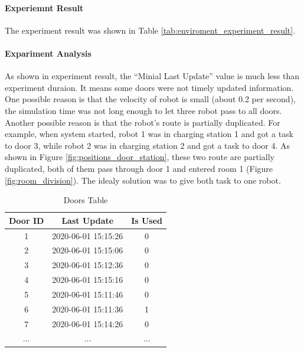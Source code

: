 \paragraph{Experiemnt Result} The experiment result was shown in Table \ref{tab:enviroment_experiment_result}. 

\paragraph{Expariment Analysis} As shown in experiment result, the ``Minial Last Update'' value is much less than experiment duraion. It means some doors were not timely updated information. One possible reason is that the velocity of robot is small (about 0.2 per second), the simulation time was not long enough to let three robot pass to all doors. Another possible reason is that the robot's route is partially duplicated. For example, when system started, robot 1 was in charging station 1 and got a task to door 3, while robot 2 was in charging station 2 and got a task to door 4. As shown in Figure \ref{fig:positions_door_station}, these two route are partially duplicated, both of them pass through door 1 and entered room 1 (Figure \ref{fig:room_division}). The idealy solution was to give both task to one robot. 


\begin{table}[htb]
\centering
\begin{tabular}{|c|c|c|} 
\hline
Door ID & Last Update & Is Used \\ \hline
1 & 2020-06-01 15:15:26 & 0 \\ \hline
2 & 2020-06-01 15:15:06 & 0 \\ \hline
3 & 2020-06-01 15:12:36 & 0 \\ \hline
4 & 2020-06-01 15:15:16 & 0 \\ \hline
5 & 2020-06-01 15:11:46 & 0 \\ \hline
6 & 2020-06-01 15:11:36 & 1 \\ \hline
7 & 2020-06-01 15:14:26 & 0 \\ \hline
...& ...& ... \\ \hline
\end{tabular}
\caption{Doors Table}
\label{tab:db_doors}
\end{table}


